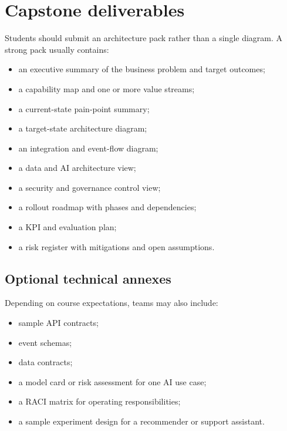\section{Capstone deliverables}
Students should submit an architecture pack rather than a single diagram. A strong pack usually contains:
\begin{itemize}
  \item an executive summary of the business problem and target outcomes;
  \item a capability map and one or more value streams;
  \item a current-state pain-point summary;
  \item a target-state architecture diagram;
  \item an integration and event-flow diagram;
  \item a data and AI architecture view;
  \item a security and governance control view;
  \item a rollout roadmap with phases and dependencies;
  \item a KPI and evaluation plan;
  \item a risk register with mitigations and open assumptions.
\end{itemize}

\subsection{Optional technical annexes}
Depending on course expectations, teams may also include:
\begin{itemize}
  \item sample API contracts;
  \item event schemas;
  \item data contracts;
  \item a model card or risk assessment for one AI use case;
  \item a RACI matrix for operating responsibilities;
  \item a sample experiment design for a recommender or support assistant.
\end{itemize}

